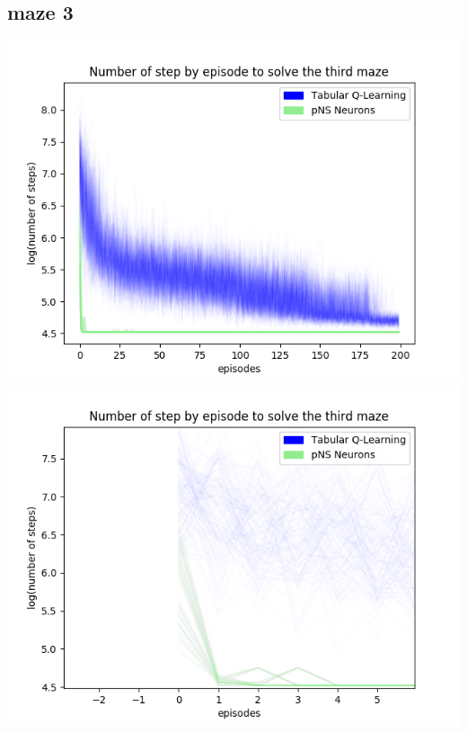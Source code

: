 \documentclass[10pt]{article}
\begin{document}
\subsection{maze 3}
\indent\indent\indent\indent\includegraphics[scale=0.48]{Figure_log_final3.png}\includegraphics[scale=0.48]{Figure_log_beg3.png}\\
\end{document}

